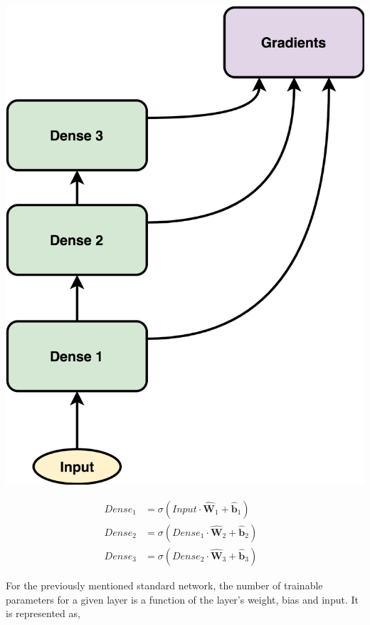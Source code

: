 \documentclass{article}
\let\oldhat\hat
\renewcommand{\hat}[1]{\oldhat{\mathbf{#1}}}
\begin{document}
\noindent\begin{minipage}{.45\textwidth}
   \centering
   \includegraphics[scale=0.09]{SimpleFFN.png}
   \label{fig:SimpleFFN.png}
\end{minipage}
\begin{minipage}{.45\textwidth}
\begin{equation}
\label{eq:ffn_math_representation}
\begin{aligned}
   Dense_{1} &= \sigma(Input \cdot \hat{W}_{1} + \hat{b}_{1}) &\\
   Dense_{2} &= \sigma(Dense_{1} \cdot \hat{W}_{2} + \hat{b}_{2}) &\\
   Dense_{3} &= \sigma(Dense_{2} \cdot \hat{W}_{3} + \hat{b}_{3}) 
\end{aligned}
\end{equation}
\end{minipage}

For the previously mentioned standard network, the number of trainable parameters for a given layer is a function of the layer's weight, bias and input. It is represented as, 
\end{document}

